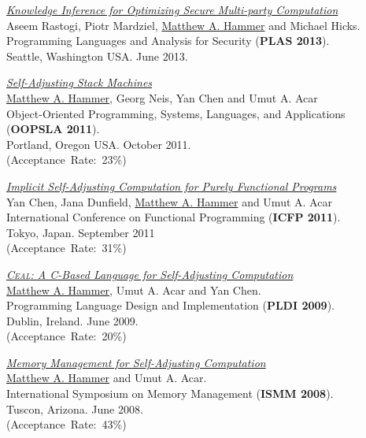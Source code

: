 \documentclass[10pt,letterpaper]{article}
\newcommand{\BeanCounter}[1]{(Acceptance~Rate:~#1\%)}
\renewenvironment{itemize}{
  \begin{list}{}{
    \setlength{\leftmargin}{1.5em}
    \setlength{\itemsep}{0.25em}
    \setlength{\parskip}{0pt}
    \setlength{\parsep}{0.25em}
  }
}{
  \end{list}
}
\begin{document}
\begin{itemize}
\item
\href{http://www.cs.umd.edu/~hammer/plas2013}
{\textit{Knowledge Inference for Optimizing Secure Multi-party Computation}}
\\
Aseem Rastogi, Piotr Mardziel, \underline{Matthew A. Hammer} and Michael Hicks.
\\
Programming Languages and Analysis for Security (\textbf{PLAS 2013}).
\\
Seattle, Washington USA. June 2013.

\item
\href{http://www.cs.umd.edu/~hammer/oopsla11}
{\textit{Self-Adjusting Stack Machines}}
\\
\underline{Matthew A. Hammer}, Georg Neis, Yan Chen and Umut A. Acar 
\\
Object-Oriented Programming, Systems, Languages, and Applications
(\textbf{OOPSLA 2011}).
\\
Portland, Oregon USA. October 2011.
\\
\BeanCounter{23}

\item
\href{http://www.cs.umd.edu/~hammer/icfp11}
{\textit{Implicit Self-Adjusting Computation for Purely Functional Programs}}
\\
Yan Chen, Jana Dunfield, \underline{Matthew A. Hammer} and Umut A. Acar 
\\
International Conference on Functional Programming (\textbf{ICFP 2011}).
\\
Tokyo, Japan. September 2011
\\
\BeanCounter{31}

\item
\href{http://www.cs.umd.edu/~hammer/pldi09}
{\textit{\textsc{Ceal}: A C-Based Language for Self-Adjusting Computation}}
\\
\underline{Matthew A. Hammer}, Umut A. Acar and Yan Chen.
\\
Programming Language Design and Implementation (\textbf{PLDI 2009}).
\\
Dublin, Ireland. June 2009.
\\
\BeanCounter{20}

\item
\href{http://www.cs.umd.edu/~hammer/ismm08}
{\textit{Memory Management for Self-Adjusting Computation}}
\\
\underline{Matthew A. Hammer} and Umut A. Acar.
\\
International Symposium on Memory Management (\textbf{ISMM 2008}).
\\
Tuscon, Arizona. June 2008.
\\
\BeanCounter{43}


\end{itemize}
\end{document}
